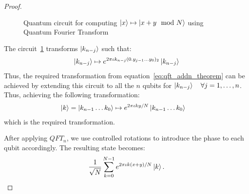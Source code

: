 \begin{proof}
\begin{figure}[ht]
    \label{fig:circ_controlrot}
\end{figure}
\begin{figure}[H]
    \centering
    \caption{Quantum circuit for computing $\ket{x} \mapsto \ket{x + y \mod N}$ using Quantum Fourier Transform}
    \label{fig:add_QFT_circ_theorem}
\end{figure}
The circuit~\ref{fig:circ_controlrot} transforms $\ket{k_{n-j}}$ such that:
\[
\ket{k_{n-j}} \mapsto  e^{2\pi\iota k_{n-j}(0.y_{j-1}\ldots y_0)_2}\ket{k_{n-j}} 
\]
Thus, the required transformation from equation~\eqref{eq:qft_addn_theorem} can be achieved by extending this circuit to all the $n$ qubits for $\ket{k_{n-j}}\quad \forall j=1,\ldots,n$. Thus, achieving the following transformation:
\begin{align*}
\ket{k} = \ket{k_{n-1} \ldots k_0} &\mapsto e^{2\pi\iota ky/N}\ket{k_{n-1} \ldots k_0}
\end{align*}
which is the required transformation.

After applying $QFT_n$, we use controlled rotations to introduce the phase to each qubit accordingly. The resulting state becomes:
\begin{equation}
    \frac{1}{\sqrt{N}} \sum_{k=0}^{N-1} e^{2\pi\iota k(x+y)/N} \ket{k}.
\end{equation}


\end{proof}
